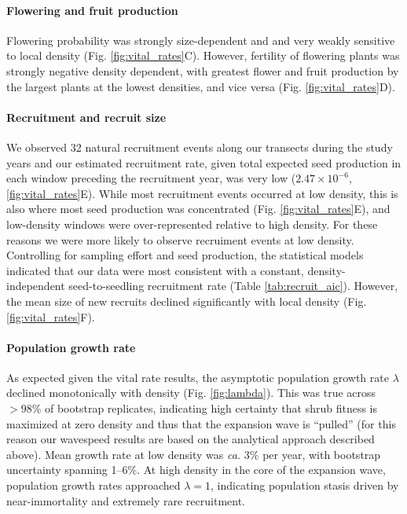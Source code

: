 \documentclass[11pt]{article}\usepackage[]{graphicx}\usepackage[usenames,dvipsnames]{xcolor}
\begin{document}
\paragraph{Flowering and fruit production}
Flowering probability was strongly size-dependent and and very weakly sensitive to local density (Fig. \ref{fig:vital_rates}C). 
However, fertility of flowering plants was strongly negative density dependent, with greatest flower and fruit production by the largest plants at the lowest densities, and vice versa (Fig. \ref{fig:vital_rates}D).

\paragraph{Recruitment and recruit size}
We observed 32 natural recruitment events along our transects during the study years and our estimated recruitment rate, given total expected seed production in each window preceding the recruitment year, was very low ($2.47 \times 10^{-6}$, \ref{fig:vital_rates}E). 
While most recruitment events occurred at low density, this is also where most seed production was concentrated (Fig. \ref{fig:vital_rates}E), and low-density windows were over-represented relative to high density. 
For these reasons we were more likely to observe recruiment events at low density. 
Controlling for sampling effort and seed production, the statistical models indicated that our data were most consistent with a constant, density-independent seed-to-seedling recruitment rate (Table \ref{tab:recruit_aic}). 
However, the mean size of new recruits declined significantly with local density (Fig. \ref{fig:vital_rates}F).


\paragraph{Population growth rate}
As expected given the vital rate results, the asymptotic population growth rate $\lambda$ declined monotonically with density (Fig. \ref{fig:lambda}). 
This was true across $>98\%$ of bootstrap replicates, indicating high certainty that shrub fitness is maximized at zero density and thus that the expansion wave is ``pulled'' (for this reason our wavespeed results are based on the analytical approach described above). 
Mean growth rate at low density was \textit{ca.} 3\% per year, with bootstrap uncertainty spanning 1--6\%.
At high density in the core of the expansion wave, population growth rates approached $\lambda=1$, indicating population stasis driven by near-immortality and extremely rare recruitment. 
\end{document}
